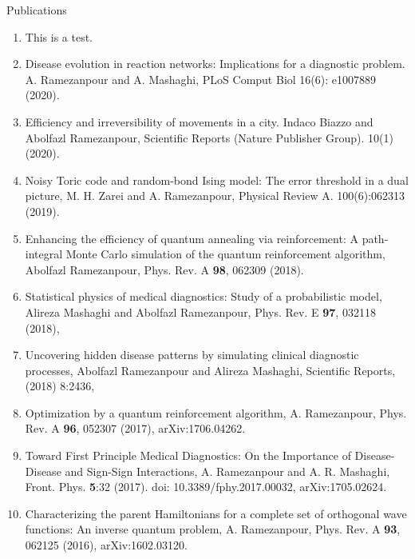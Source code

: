 \documentclass[aps,preprint]{revtex4-1}
\begin{document}
\begin{center}
\begin{large}Publications\end{large}
\end{center}


\begin{enumerate}

\item This is a test.

\item Disease evolution in reaction networks: Implications for a diagnostic problem. A. Ramezanpour and A. Mashaghi, PLoS Comput Biol 16(6): e1007889 (2020).
  
\item Efficiency and irreversibility of movements in a city. Indaco Biazzo and Abolfazl Ramezanpour, Scientific Reports (Nature Publisher Group). 10(1) (2020). 

\item Noisy Toric code and random-bond Ising model: The error threshold in a dual picture, M. H. Zarei and A. Ramezanpour, Physical Review A. 100(6):062313 (2019). 

\item Enhancing the efficiency of quantum annealing via reinforcement: A path-integral Monte Carlo
simulation of the quantum reinforcement algorithm, Abolfazl Ramezanpour, Phys. Rev. A \textbf{98}, 062309 (2018).


\item Statistical physics of medical diagnostics: Study of a probabilistic model, Alireza Mashaghi and Abolfazl Ramezanpour, Phys. Rev. E \textbf{97}, 032118 (2018),


\item Uncovering hidden disease patterns by simulating clinical diagnostic processes, Abolfazl Ramezanpour and Alireza Mashaghi, Scientific Reports, (2018) 8:2436,


\item Optimization by a quantum reinforcement algorithm, A. Ramezanpour, Phys. Rev. A \textbf{96}, 052307 (2017),  arXiv:1706.04262.

\item Toward First Principle Medical Diagnostics: On the Importance of Disease-Disease and Sign-Sign Interactions, A. Ramezanpour and A. R. Mashaghi, Front. Phys. \textbf{5}:32 (2017). doi: 10.3389/fphy.2017.00032,  arXiv:1705.02624.

\item  Characterizing the parent Hamiltonians for a complete set of orthogonal wave functions: An inverse quantum problem, A. Ramezanpour, Phys. Rev. A \textbf{93}, 062125 (2016),  arXiv:1602.03120.


\end{enumerate}
\end{document}
